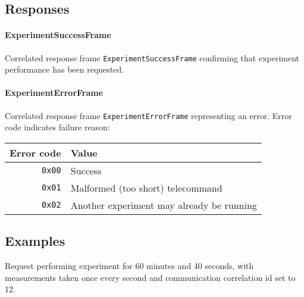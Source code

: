 \begin{tcarglist}
\end{tcarglist}

\subsection{Responses}
\paragraph{ExperimentSuccessFrame}

Correlated response frame \texttt{ExperimentSuccessFrame} confirming 
that \detumbling experiment performance has been requested.

\paragraph{ExperimentErrorFrame}
Correlated response frame \texttt{ExperimentErrorFrame} representing an error. 
Error code indicates failure reason:

\begin{tabular}{r | l}
    Error code & Value \\
    \hline
    \texttt{0x00}   & Success \\
    \texttt{0x01}   & Malformed (too short) telecommand \\
    \texttt{0x02}   & Another experiment may already be running \\
\end{tabular}

\subsection{Examples}
Request performing \detumbling experiment for 60 minutes and 40 seconds, with measurements taken once every second and communication correlation id set to 12.

